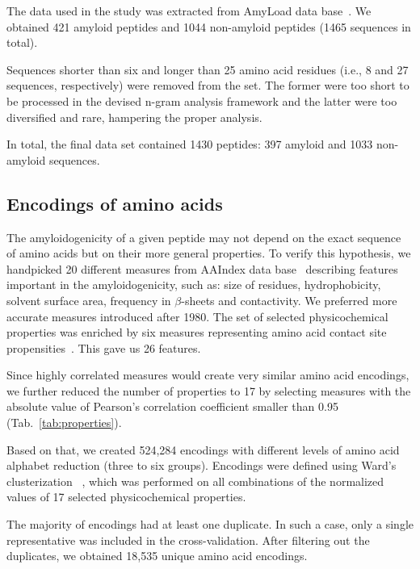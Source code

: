 \documentclass[fleqn,10pt,twoside]{gcb15submission}
\begin{document}
The data used in the study was extracted from AmyLoad data 
base~\citep{wozniak_amyload:_2015}. We obtained 421 amyloid peptides and 
1044 non-amyloid peptides (1465 sequences in total).

  Sequences shorter than six and longer than 25 amino acid residues (i.e., 8 and 
27 sequences, respectively) were removed from the set. The former were too short 
to be processed in the devised n-gram analysis framework and the latter were too 
diversified and rare, hampering the proper analysis.

  In total, the final data set contained 1430 peptides: 397 amyloid
and 1033 non-amyloid sequences. 

\subsection{Encodings of amino acids}

The amyloidogenicity of a given peptide may not depend on the exact sequence of 
amino acids but on their more general properties. To verify this hypothesis, we 
handpicked 20 different measures from AAIndex data base~\citep{kawashima_aaindex:_2008} 
describing features important in the amyloidogenicity, such as: size of 
residues, hydrophobicity, solvent surface area, frequency in $\beta$-sheets and 
contactivity. We preferred more accurate measures introduced after 1980. 
The set of selected physicochemical properties was enriched by 
six measures representing amino acid contact site 
propensities~\cite{wozniak_characteristics_2014}. This gave us  26 features.

  Since highly correlated measures would create very similar amino acid 
encodings, we further reduced the number of properties to 17 by selecting 
measures with the absolute value of Pearson's correlation coefficient smaller 
than 0.95 (Tab.~\ref{tab:properties}). 

  Based on that, we created 524,284 encodings with different levels of amino 
acid alphabet reduction (three to six groups). Encodings were defined using 
Ward's clusterization ~\citep{joe_h._ward_jr_hierarchical_1963}, which was 
performed on all combinations of the normalized values of 17 selected 
physicochemical properties.

  The majority of encodings had at least one duplicate. In such a case, only a 
single representative was included in the cross-validation. After filtering out the 
duplicates, we obtained 18,535 unique amino acid encodings.
\end{document}
